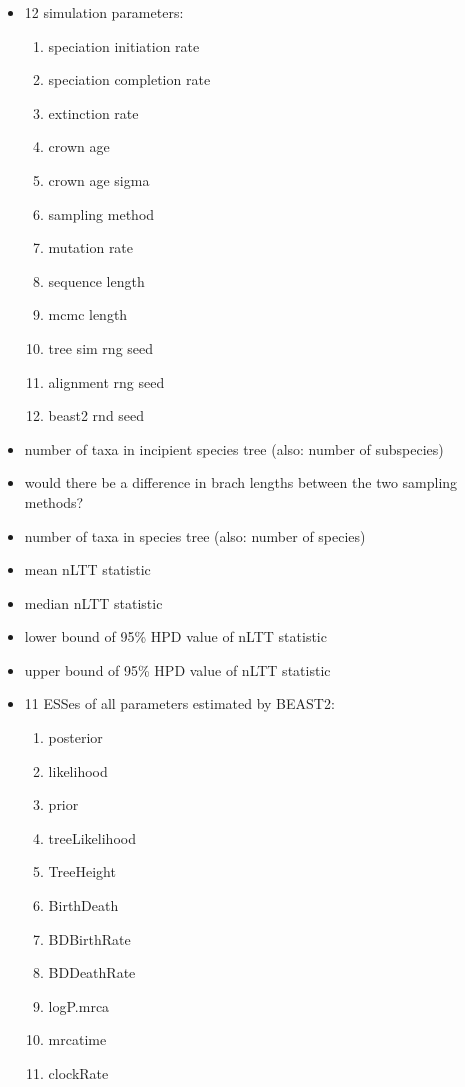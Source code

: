 \documentclass{article}
\begin{document}
\begin{itemize}  
  \item 12 simulation parameters:
  \begin{enumerate}  
    \item speciation initiation rate
    \item speciation completion rate
    \item extinction rate
    \item crown age
    \item crown age sigma
    \item sampling method
    \item mutation rate
    \item sequence length
    \item mcmc length
    \item tree sim rng seed
    \item alignment rng seed
    \item beast2 rnd seed
  \end{enumerate}
  \item number of taxa in incipient species tree (also: number of subspecies)
  \item would there be a difference in brach lengths between the two sampling methods?
  \item number of taxa in species tree (also: number of species)
  \item mean nLTT statistic
  \item median nLTT statistic
  \item lower bound of 95\% HPD value of nLTT statistic
  \item upper bound of 95\% HPD value of nLTT statistic
  \item 11 ESSes of all parameters estimated by BEAST2:
  \begin{enumerate}  
    \item posterior
    \item likelihood 
    \item prior 
    \item treeLikelihood 
    \item TreeHeight 
    \item BirthDeath 
    \item BDBirthRate 
    \item BDDeathRate 
    \item logP.mrca 
    \item mrcatime 
    \item clockRate
  \end{enumerate}
\end{itemize}
\end{document}
